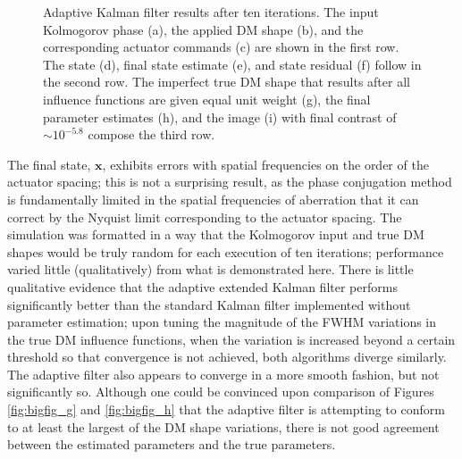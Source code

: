 \documentclass[11pt,reqno]{amsart}
\newcommand{\mbf}{\mathbf}
\begin{document}
\begin{figure}[h!]
\begin{center}
	\end{center}
\caption{Adaptive Kalman filter results after ten iterations.  The input Kolmogorov phase (a), the applied DM shape (b), and the corresponding actuator commands (c) are shown in the first row.  The state (d), final state estimate (e), and state residual (f) follow in the second row.  The imperfect true DM shape that results after all influence functions are given equal unit weight (g), the final parameter estimates (h), and the image (i) with final contrast of $\sim\!\!10^{-5.8}$ compose the third row. \label{fig:bigfig}}
\end{figure}

The final state, $\mbf{x}$, exhibits errors with spatial frequencies on the order of the actuator spacing; this is not a surprising result, as the phase conjugation method is fundamentally limited in the spatial frequencies of aberration that it can correct by the Nyquist limit corresponding to the actuator spacing.  The simulation was formatted in a way that the Kolmogorov input and true DM shapes would be truly random for each execution of ten iterations; performance varied little (qualitatively) from what is demonstrated here.  There is little qualitative evidence that the adaptive extended Kalman filter performs significantly better than the standard Kalman filter implemented without parameter estimation; upon tuning the magnitude of the FWHM variations in the true DM influence functions, when the variation is increased beyond a certain threshold so that convergence is not achieved, both algorithms diverge similarly.  The adaptive filter also appears to converge in a more smooth fashion, but not significantly so.  Although one could be convinced upon comparison of Figures \ref{fig:bigfig_g} and \ref{fig:bigfig_h} that the adaptive filter is attempting to conform to at least the largest of the DM shape variations, there is not good agreement between the estimated parameters and the true parameters.
\end{document}
